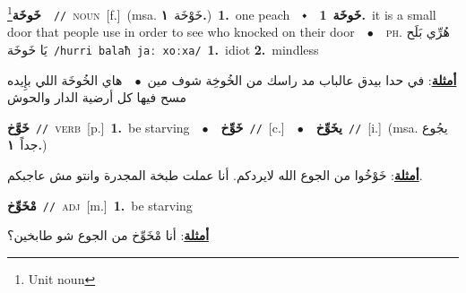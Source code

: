 \documentclass[10pt,a4paper,twoside]{article} %
\begin{document}
\begin{multicols}{2}
{\setlength\topsep{0pt}\textbf{\foreignlanguage{arabic}{خَوخَة}}\footnote{Unit noun}\ \ {\color{gray}\texttt{//}\color{black}}\ \textsc{noun}\ [f.]\ \color{gray}(msa. \foreignlanguage{arabic}{خَوْخَة}~\foreignlanguage{arabic}{\textbf{١.}})\color{black}\ \textbf{1.}~one peach\ \ $\smblkdiamond$\ \ \setlength\topsep{0pt}\textbf{\foreignlanguage{arabic}{خَوخَة}}\ \textbf{1.}~it is a small door that people use in order to see who knocked on their door\ \ $\bullet$\ \ \textsc{ph.} \color{gray} \foreignlanguage{arabic}{هُرِّي بَلَح يَا خَوخَة}\color{black}\ {\color{gray}\texttt{/{\sffamily hurri balaħ jaː xoːxa}/}\color{black}}\ \textbf{1.}~idiot  \textbf{2.}~mindless\  \begin{flushright}\color{gray}\foreignlanguage{arabic}{\textbf{\underline{\foreignlanguage{arabic}{أمثلة}}}: في حدا بيدق عالباب مد راسك من الخُوخِة شوف مين\ $\bullet$\ \  هاي الخُوخَة اللي بإِيده مسح فيها كل أرضية الدار والحوش}\end{flushright}\color{black}} \vspace{2mm}

{\setlength\topsep{0pt}\textbf{\foreignlanguage{arabic}{خَوَّخ}}\ {\color{gray}\texttt{//}\color{black}}\ \textsc{verb}\ [p.]\ \textbf{1.}~be starving\ \ $\bullet$\ \ \setlength\topsep{0pt}\textbf{\foreignlanguage{arabic}{خَوِّخ}}\ {\color{gray}\texttt{//}\color{black}}\ [c.]\ \ $\bullet$\ \ \setlength\topsep{0pt}\textbf{\foreignlanguage{arabic}{يخَوِّخ}}\ {\color{gray}\texttt{//}\color{black}}\ [i.]\ \color{gray}(msa. \foreignlanguage{arabic}{يجُوع جداً}~\foreignlanguage{arabic}{\textbf{١.}})\color{black}\  \begin{flushright}\color{gray}\foreignlanguage{arabic}{\textbf{\underline{\foreignlanguage{arabic}{أمثلة}}}: خَوْخُوا من الجوع الله لايردكم. أنا عملت طبخة المجدرة وانتو مش عاجبكم.}\end{flushright}\color{black}} \vspace{2mm}

{\setlength\topsep{0pt}\textbf{\foreignlanguage{arabic}{مْخَوِّخ}}\ {\color{gray}\texttt{//}\color{black}}\ \textsc{adj}\ [m.]\ \textbf{1.}~be starving\  \begin{flushright}\color{gray}\foreignlanguage{arabic}{\textbf{\underline{\foreignlanguage{arabic}{أمثلة}}}: أنا مْخَوِّخ من الجوع شو طابخين؟}\end{flushright}\color{black}} \vspace{2mm}


\end{multicols}
\end{document}
